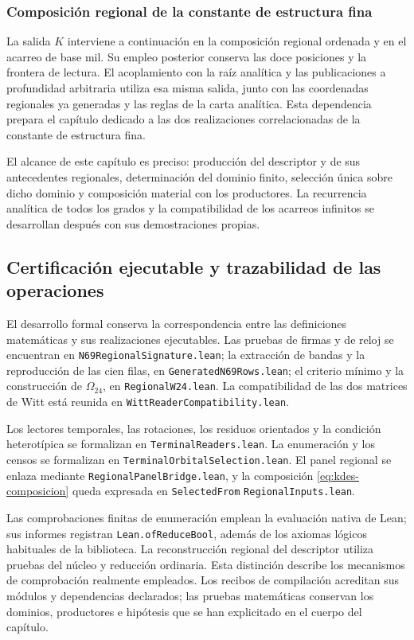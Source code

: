 \subsubsection{Composición regional de la constante de estructura fina}

La salida $K$ interviene a continuación en la composición regional
ordenada y en el acarreo de base mil. Su empleo posterior conserva las
doce posiciones y la frontera de lectura. El acoplamiento con la raíz
analítica y las publicaciones a profundidad arbitraria utiliza esa
misma salida, junto con las coordenadas regionales ya generadas y las
reglas de la carta analítica. Esta dependencia prepara el capítulo
dedicado a las dos realizaciones correlacionadas de la constante de
estructura fina.

El alcance de este capítulo es preciso: producción del descriptor y
de sus antecedentes regionales, determinación del dominio finito,
selección única sobre dicho dominio y composición material con los
productores. La recurrencia analítica de todos los grados y la
compatibilidad de los acarreos infinitos se desarrollan después con sus
demostraciones propias.

\subsection{Certificación ejecutable y trazabilidad de las operaciones}

El desarrollo formal conserva la correspondencia entre las
definiciones matemáticas y sus realizaciones ejecutables. Las pruebas
de firmas y de reloj se encuentran en
\texttt{N69RegionalSignature.lean}; la extracción de bandas y la
reproducción de las cien filas, en
\texttt{GeneratedN69Rows.lean}; el criterio mínimo y la construcción
de $\Omega_{24}$, en \texttt{RegionalW24.lean}. La compatibilidad de
las dos matrices de Witt está reunida en
\texttt{WittReaderCompatibility.lean}.

Los lectores temporales, las rotaciones, los residuos orientados y la
condición heterotípica se formalizan en
\texttt{TerminalReaders.lean}. La enumeración y los censos se
formalizan en \texttt{Terminal}\allowbreak\texttt{Orbital}\allowbreak\texttt{Selection.lean}. El panel
regional se enlaza mediante \texttt{Regional}\allowbreak\texttt{Panel}\allowbreak\texttt{Bridge.lean}, y la
composición \eqref{eq:kdes-composicion} queda expresada en
\texttt{Selected}\allowbreak\texttt{From}\allowbreak%
\texttt{Regional}\allowbreak\texttt{Inputs.lean}.

Las comprobaciones finitas de enumeración emplean la evaluación nativa
de Lean; sus informes registran \texttt{Lean.ofReduceBool}, además
de los axiomas lógicos habituales de la biblioteca. La reconstrucción
regional del descriptor utiliza pruebas del núcleo y reducción
ordinaria. Esta distinción describe los mecanismos de comprobación
realmente empleados. Los recibos de compilación acreditan sus módulos
y dependencias declarados; las pruebas matemáticas conservan los
dominios, productores e hipótesis que se han explicitado en el cuerpo
del capítulo.
